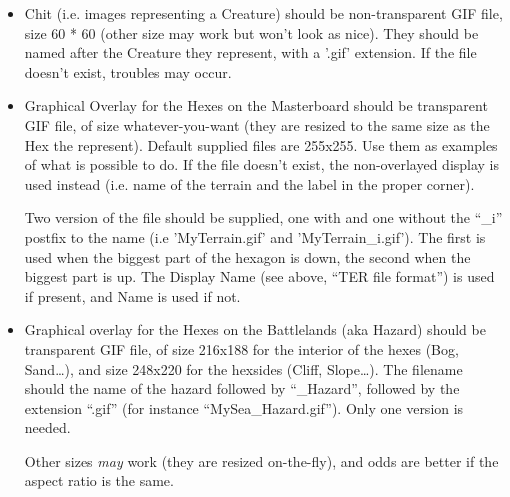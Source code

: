 \documentclass{article}
\begin{document}
\begin{itemize}
\item Chit (i.e. images representing a Creature) should be non-transparent
GIF file, size 60 * 60 (other size may work but won't look as nice). 
They should be named after the Creature they represent, with a '.gif'
extension. If the file doesn't exist, troubles may occur.

\item Graphical Overlay for the Hexes on the Masterboard should be
transparent GIF file, of size whatever-you-want (they are resized
to the same size as the Hex the represent). Default supplied
files are 255x255. Use them as examples of what is possible to do.
If the file doesn't exist, the non-overlayed display is used
instead (i.e. name of the terrain and the label in the proper
corner).

Two version of the file should be supplied, one with and one without
the ``\_i'' postfix to the name (i.e 'MyTerrain.gif' and 'MyTerrain\_i.gif').
The first is used when the biggest part of the hexagon is down,
the second when the biggest part is up. The Display Name (see
above, ``TER file format'') is used if present, and Name is used
if not.

\item Graphical overlay for the Hexes on the Battlelands (aka
Hazard) should be transparent GIF file, of size 216x188
for the interior of the hexes (Bog, Sand\ldots), and size 248x220
for the hexsides (Cliff, Slope\ldots). The filename should the name
of the hazard followed by ``\_Hazard'', followed by the extension
``.gif'' (for instance ``MySea\_Hazard.gif''). Only one version
is needed.

Other sizes \emph{may} work (they are resized on-the-fly), and odds are
better if the aspect ratio is the same.
\end{itemize}
\end{document}
